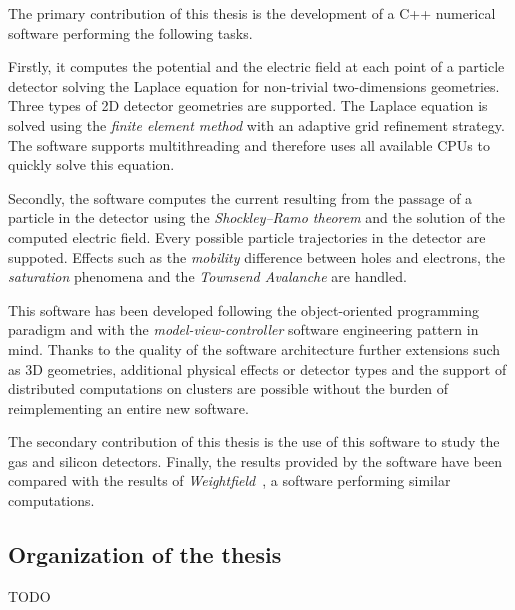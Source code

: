 \documentclass[11pt]{article}
\begin{document}
	The primary contribution of this thesis is the development of a C++ numerical software performing the
	following tasks.

	Firstly, it computes the potential and the electric field
	at each point of a particle detector solving the Laplace equation for non-trivial
	two-dimensions geometries. Three types of 2D detector geometries are supported.
	The Laplace equation is solved using the \textit{finite element method} with an adaptive
	grid refinement strategy. The software supports multithreading and therefore
	uses all available CPUs to quickly solve this equation.

	Secondly, the software computes the current resulting from the passage of a particle
	in the detector using the \textit{Shockley–Ramo theorem} and the solution of the
	computed electric field. Every possible particle trajectories in the detector
	are suppoted. Effects such as the \textit{mobility} difference between holes and
	electrons, the \textit{saturation} phenomena and the \textit{Townsend Avalanche}
	are handled.

	This software has been developed following the object-oriented
	programming paradigm and with the \textit{model-view-controller}
	software engineering pattern in mind. Thanks to the quality of the software
	architecture further extensions such as 3D geometries, additional physical effects or
	detector types and the support of distributed computations on clusters are possible
	without the burden of reimplementing an entire new software.

	The secondary contribution of this thesis is the use of this software to study
	the gas and silicon detectors. Finally, the results provided by the
	software have been compared with the results of \textit{Weightfield}~\cite{Cenna2015}, a
	software performing similar computations.


	\subsection*{Organization of the thesis}

	TODO

\end{document}
